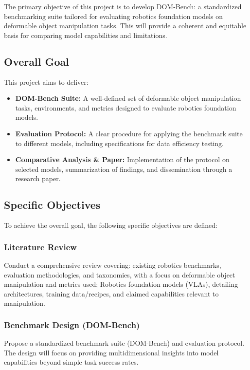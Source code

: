 The primary objective of this project is to develop DOM-Bench: a standardized benchmarking suite tailored for evaluating robotics foundation models on deformable object manipulation tasks. This will provide a coherent and equitable basis for comparing model capabilities and limitations.

\subsection{Overall Goal}

This project aims to deliver:
\begin{itemize}
    \item \textbf{DOM-Bench Suite:} A well-defined set of deformable object manipulation tasks, environments, and metrics designed to evaluate robotics foundation models.
    \item \textbf{Evaluation Protocol:} A clear procedure for applying the benchmark suite to different models, including specifications for data efficiency testing.
    \item \textbf{Comparative Analysis \& Paper:} Implementation of the protocol on selected models, summarization of findings, and dissemination through a research paper.
\end{itemize}


\subsection{Specific Objectives}

To achieve the overall goal, the following specific objectives are defined:

\subsubsection{Literature Review} %
Conduct a comprehensive review covering: existing robotics benchmarks, evaluation methodologies, and taxonomies, with a focus on deformable object manipulation and metrics used; Robotics foundation models (VLAs), detailing architectures, training data/recipes, and claimed capabilities relevant to manipulation.

\subsubsection{Benchmark Design (DOM-Bench)}
Propose a standardized benchmark suite (DOM-Bench) and evaluation protocol. The design will focus on providing multidimensional insights into model capabilities beyond simple task success rates.


